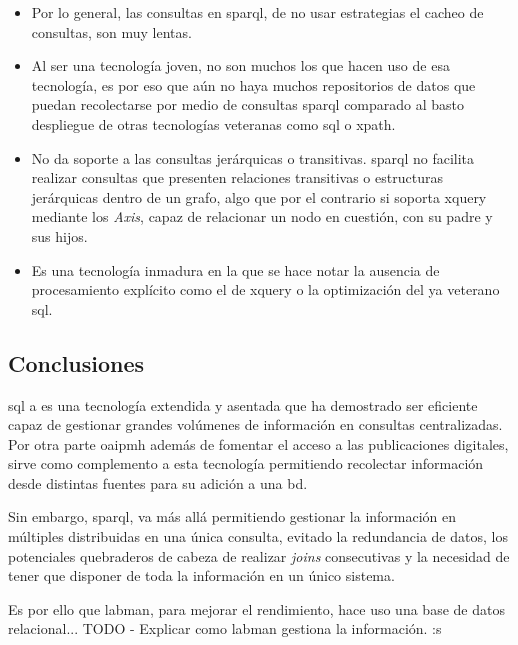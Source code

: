 \begin{itemize}
	\item Por lo general, las consultas en \acrshort{sparql}, de no usar estrategias el cacheo de consultas\cite{SPARQL_Performance}, son muy lentas.

	\item Al ser una tecnología joven, no son muchos los que hacen uso de esa tecnología, es por eso que aún no haya muchos repositorios de datos que puedan recolectarse por medio de consultas \acrshort{sparql} comparado al basto despliegue de otras tecnologías veteranas como \acrshort{sql} o \acrshort{xpath}\cite{XPath}.

	\item No da soporte a las consultas jerárquicas o transitivas. \acrshort{sparql} no facilita realizar consultas que presenten relaciones transitivas o estructuras jerárquicas dentro de un grafo, algo que por el contrario si soporta \acrshort{xquery} mediante los \textit{Axis}, capaz de relacionar un nodo en cuestión, con su padre y sus hijos\cite{XQueryAxes}.

	\item Es una tecnología inmadura en la que se hace notar la ausencia de procesamiento explícito como el de \acrshort{xquery} o la optimización del ya veterano \acrshort{sql}.
\end{itemize}

\subsection{Conclusiones}

\acrshort{sql} a es una tecnología extendida y asentada que ha demostrado ser eficiente capaz de gestionar grandes volúmenes de información en consultas centralizadas. Por otra parte \acrshort{oaipmh} además de fomentar el acceso a las publicaciones digitales, sirve como complemento a esta tecnología permitiendo recolectar información desde distintas fuentes para su adición a una \acrshort{bd}.

Sin embargo, \acrshort{sparql}, va más allá permitiendo gestionar la información en múltiples  distribuidas en una única consulta, evitado la redundancia de datos, los potenciales quebraderos de cabeza de realizar \textit{joins} consecutivas y la necesidad de tener que disponer de toda la información en un único sistema.

Es por ello que \acrshort{labman}, para mejorar el rendimiento, hace uso una base de datos relacional... TODO - Explicar como \acrshort{labman} gestiona la información. :s